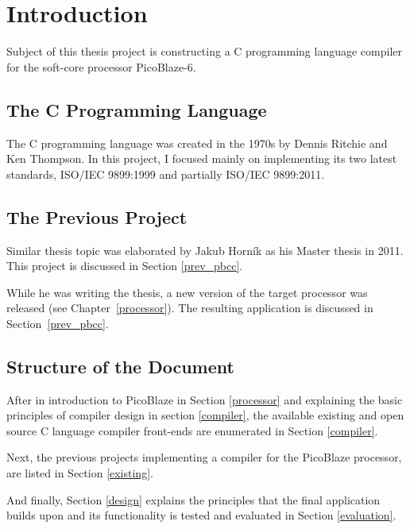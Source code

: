 
\newcommand{\todo}[1]{\textcolor{red}{TODO\:} \textcolor{gray}{#1}}

\chapter{Introduction}\label{introduction}

Subject of this thesis project is constructing a C programming language compiler for the soft-core processor PicoBlaze-6.

    \section{The C Programming Language}

    The C programming language was created in the 1970s by Dennis Ritchie and Ken Thompson. In this project, I focused mainly on implementing its two latest standards, ISO/IEC 9899:1999 \cite{C99} and partially ISO/IEC 9899:2011.\cite{C11}

    \section{The Previous Project}
    Similar thesis topic was elaborated by Jakub Horník as his Master thesis in 2011. This project is discussed in Section \ref{prev_pbcc}.

    While he was writing the thesis, a new version of the target processor was released (see Chapter~\ref{processor}). The resulting application is discussed in Section~\ref{prev_pbcc}.

    \section{Structure of the Document}

    After in introduction to PicoBlaze in Section \ref{processor} and explaining the basic principles of compiler design in section \ref{compiler}, the available existing and open source C language compiler front-ends are enumerated in Section \ref{compiler}.

    Next, the previous projects implementing a compiler for the PicoBlaze processor, are listed in Section \ref{existing}.

    And finally, Section \ref{design} explains the principles that the final application builds upon and its functionality is tested and evaluated in Section \ref{evaluation}.

